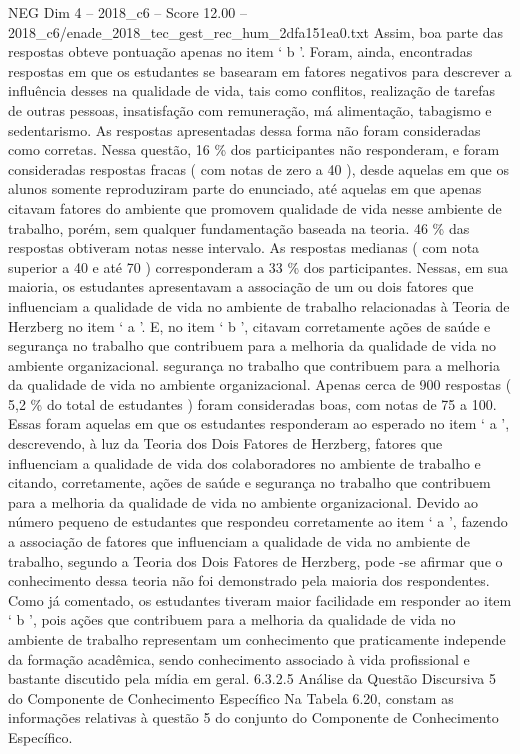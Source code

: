 \begin{textsample}{NEG Dim 4 – 2018\_c6 – Score 12.00 – 2018\_c6/enade\_2018\_tec\_gest\_rec\_hum\_2dfa151ea0.txt}
Assim, boa parte das respostas obteve pontuação apenas no item ‘ b ’.
Foram, ainda, encontradas respostas em que os estudantes se basearam em fatores negativos para descrever a influência desses na qualidade de vida, tais como conflitos, realização de tarefas de outras pessoas, insatisfação com remuneração, má alimentação, tabagismo e sedentarismo.
As respostas apresentadas dessa forma não foram consideradas como corretas.
Nessa questão, 16 \% dos participantes não responderam, e foram consideradas respostas fracas ( com notas de zero a 40 ), desde aquelas em que os alunos somente reproduziram parte do enunciado, até aquelas em que apenas citavam fatores do ambiente que promovem qualidade de vida nesse ambiente de trabalho, porém, sem qualquer fundamentação baseada na teoria. 46 \% das respostas obtiveram notas nesse intervalo.
As respostas medianas ( com nota superior a 40 e até 70 ) corresponderam a 33 \% dos participantes.
Nessas, em sua maioria, os estudantes apresentavam a associação de um ou dois fatores que influenciam a qualidade de vida no ambiente de trabalho relacionadas à Teoria de Herzberg no item ‘ a ’.
E, no item ‘ b ’, citavam corretamente ações de saúde e segurança no trabalho que contribuem para a melhoria da qualidade de vida no ambiente organizacional. segurança no trabalho que contribuem para a melhoria da qualidade de vida no ambiente organizacional.
Apenas cerca de 900 respostas ( 5,2 \% do total de estudantes ) foram consideradas boas, com notas de 75 a 100.
Essas foram aquelas em que os estudantes responderam ao esperado no item ‘ a ’, descrevendo, à luz da Teoria dos Dois Fatores de Herzberg, fatores que influenciam a qualidade de vida dos colaboradores no ambiente de trabalho e citando, corretamente, ações de saúde e segurança no trabalho que contribuem para a melhoria da qualidade de vida no ambiente organizacional.
Devido ao número pequeno de estudantes que respondeu corretamente ao item ‘ a ’, fazendo a associação de fatores que influenciam a qualidade de vida no ambiente de trabalho, segundo a Teoria dos Dois Fatores de Herzberg, pode -se afirmar que o conhecimento dessa teoria não foi demonstrado pela maioria dos respondentes.
Como já comentado, os estudantes tiveram maior facilidade em responder ao item ‘ b ’, pois ações que contribuem para a melhoria da qualidade de vida no ambiente de trabalho representam um conhecimento que praticamente independe da formação acadêmica, sendo conhecimento associado à vida profissional e bastante discutido pela mídia em geral. 6.3.2.5 Análise da Questão Discursiva 5 do Componente de Conhecimento Específico Na Tabela 6.20, constam as informações relativas à questão 5 do conjunto do Componente de Conhecimento Específico.

\end{textsample}
